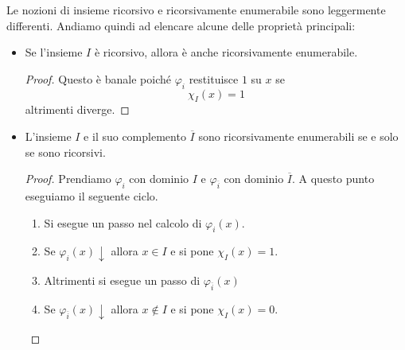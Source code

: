 \begin{property} \label{prop: r_re}
	Le nozioni di insieme ricorsivo e ricorsivamente enumerabile
	sono leggermente differenti. Andiamo quindi ad elencare
	alcune delle proprietà principali:
	\begin{itemize}
		\item Se l'insieme $I$ è ricorsivo, allora è anche
		      ricorsivamente enumerabile.
		      \begin{proof}
			      Questo è banale poiché $\varphi_i$ restituisce
			      $1$ su $x$ se
			      \[ \chi_I (x) = 1 \]
			      altrimenti diverge.
		      \end{proof}
		\item L'insieme $I$ e il suo complemento $\overline{I}$
		      sono ricorsivamente enumerabili se e solo se sono
		      ricorsivi.
		      \begin{proof}
			      Prendiamo $\varphi_i$ con dominio $I$ e
			      $\varphi_{\overline{i}}$ con dominio
			      $\overline{I}$. A questo punto eseguiamo il
			      seguente ciclo.
			      \begin{enumerate}
				      \item Si esegue un passo nel calcolo di
				            $\varphi_i(x)$.
				      \item Se $\varphi_i(x) \downarrow$ allora
				            $x \in I$ e si pone $\chi_I(x) = 1$.
				      \item Altrimenti si esegue un passo di
				            $\varphi_{\overline{i}}(x)$
				      \item Se $\varphi_{\overline{i}}(x) \downarrow$
				            allora $x \notin I$ e si pone
				            $\chi_I(x) = 0$.
			      \end{enumerate}
		      \end{proof}
	\end{itemize}
\end{property}


